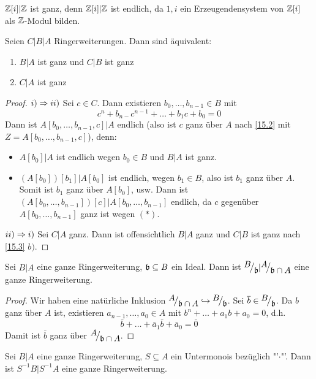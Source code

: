 \begin{bsp}
	$\mathbb{Z}[i]|\mathbb{Z}$ ist ganz, denn $\mathbb{Z}[i]|\mathbb{Z}$ ist endlich, da $1,i$ ein Erzeugendensystem von $\mathbb{Z}[i]$ als $\mathbb{Z}$-Modul bilden.
\end{bsp}
\begin{sa}\label{15.5}
	Seien $C|B|A$ Ringerweiterungen. Dann sind äquivalent:
	\begin{enumerate}[label= \roman*)]
		\item $B|A$ ist ganz und $C|B$ ist ganz
		\item $C|A$ ist ganz
	\end{enumerate}
\end{sa}
\begin{proof}
	$i)\Rightarrow ii)$ Sei $c\in C$. Dann existieren $b_0, \ldots, b_{n-1}\in B $ mit \begin{equation}\tag{$\ast$}
	c^n + b_{n-}c^{n-1} + \ldots + b_1 c+ b_0 =0
	\end{equation}
	Dann ist $A[b_0, \ldots, b_{n-1}, c]|A$ endlich (also ist $c$ ganz über $A$ nach \ref{15.2} mit $Z = A[b_0, \ldots, b_{n-1}, c]$), denn:
	\begin{itemize}
		\item $A[b_0]|A$ ist endlich wegen $b_0\in B$ und $B|A$ ist ganz.
		\item $(A[b_0])[b_1]|A[b_0]$ ist endlich, wegen $b_1\in B$, also ist $b_1$ ganz über $A$. Somit ist $b_1$ ganz über $A[b_0]$, usw. Dann ist $(A[b_0, \ldots, b_{n-1}])[c]|A[b_0, \ldots, b_{n-1}]$ endlich, da $c$ gegenüber $A[b_0, \ldots, b_{n-1}]$ ganz ist wegen $(\ast)$.
	\end{itemize}
	$ii)\Rightarrow i)$ Sei $C|A$ ganz. Dann ist offensichtlich $B|A$ ganz und $C|B$ ist ganz nach \ref{15.3} $b)$.
\end{proof}
\begin{bem}
	Sei $B|A$ eine ganze Ringerweiterung, $\mathfrak{b}\subseteq B$ ein Ideal. Dann ist $\QR{B}{\b} |\QR{A}{\b \cap A}$ eine ganze Ringerweiterung. 
\end{bem}
\begin{proof}
	Wir haben eine natürliche Inklusion $\QR{A}{\b \cap A} \hookrightarrow \QR{B}{\b}$. Sei $\bar b\in \QR{B}{\b}$. Da $b$ ganz über $A$ ist, existieren $a_{n-1}, \ldots, a_0\in A$ mit $b^n + \ldots + a_1 b + a_0 =0$, d.h. 
	$$\bar b + \ldots + \bar a_1 \bar b + \bar a_0 =\bar 0$$
	Damit ist $\bar b$ ganz über $\QR{A}{\b \cap A}$.
\end{proof}
\begin{bem}
	Sei $B|A$ eine ganze Ringerweiterung, $S\subseteq A$ ein Untermonois bezüglich "'$\cdot$"'. Dann ist $S^{-1} B |S^{-1} A$ eine ganze Ringerweiterung.
\end{bem}
